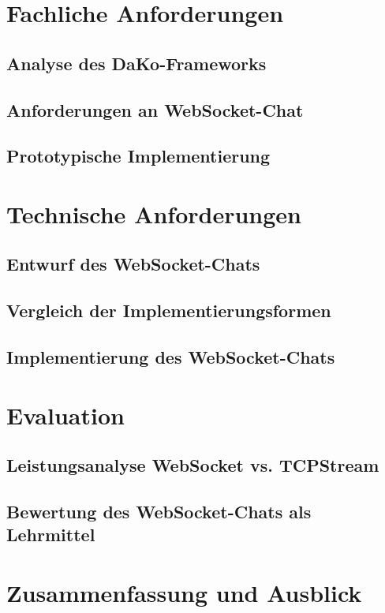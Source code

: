 \documentclass[11pt,a4paper,titlepage]{scrartcl}
\numberwithin{equation}{section}
\begin{document}
\section{Fachliche Anforderungen}
\subsection{Analyse des DaKo-Frameworks}
\subsection{Anforderungen an WebSocket-Chat}
\subsection{Prototypische Implementierung}

\section{Technische Anforderungen}
\subsection{Entwurf des WebSocket-Chats}
\subsection{Vergleich der Implementierungsformen}
\subsection{Implementierung des WebSocket-Chats}

\section{Evaluation}
\subsection{Leistungsanalyse WebSocket vs. TCPStream}
\subsection{Bewertung des WebSocket-Chats als Lehrmittel}

\section{Zusammenfassung und Ausblick}



\end{document}

